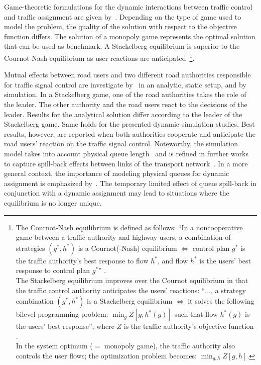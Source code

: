 Game-theoretic formulations for the dynamic interactions between traffic control and traffic assignment are given by~\citet{ChenBenAkiva1998GameDynamicTrafficControl}. 
Depending on the type of game used to model the problem, the quality of the solution with respect to the objective function differs.  
The solution of a monopoly game represents the optimal solution that can be used as benchmark. 
A Stackelberg equilibrium is superior to the Cournot-Nash equilibrium as user reactions are anticipated~\citep{ChenBenAkiva1998GameDynamicTrafficControl}\footnote{
%
The Cournot-Nash equilibrium is defined as follows: 
``In a noncooperative game between a traffic authority and highway
users, a combination of strategies $(g^*, h^*)$ is a Cournot(-Nash) equilibrium
$\Leftrightarrow$ control plan $g^*$ is the traffic authority's best
response to flow $h^*$, and flow $h^*$ is the users' 
best response to control plan $g^*$'' \citep[from][]{ChenBenAkiva1998GameDynamicTrafficControl}.
%
\\
%
The Stackelberg equilibrium improves over the Cournot equilibrium in
that the traffic control authority anticipates the users' reactions:
``$\ldots$, a strategy combination $(g^*,h^*)$ is a Stackelberg
equilibrium $\Leftrightarrow$ it solves the following bilevel
programming problem: $\min_g Z[g,h^*(g)]$ such that flow $h^*(g)$ is
the users' best response'', where $Z$ is the traffic authority's
objective function \citep[after][]{ChenBenAkiva1998GameDynamicTrafficControl}.
%
\\
%
In the system optimum ($=$ monopoly game), the traffic authority also
controls the user flows; the optimization problem becomes: $\min_{g,h}
Z[g,h]$.
%
}.

Mutual effects between road users and two different road authorities responsible for traffic signal control are investigate by~\citet{VanZuylenTaale2004UrbanRingRoads} in an analytic, static setup, and by simulation.  
In a Stackelberg game, one of the road authorities takes the role of the leader. 
The other authority and the road users react to the decisions of the leader. 
Results for the analytical solution differ according to the leader of the Stackelberg game.  
Same holds for the presented dynamic simulation studies. 
Best results, however, are reported when both authorities cooperate and anticipate the road users' reaction on the traffic signal control. 
Noteworthy, the simulation model takes into account physical queue length~\citep{TaaleVanZuylen2003AnticipatoryTrafficControl} and is refined in further works to capture spill-back effects between links of the transport network~\citep{Taale2008Phd}. 
In a more general context, the importance of modeling physical queues for dynamic assignment is emphasized by~\citet{DaganzoAssign-w-queues}.  
The temporary limited effect of queue spill-back in conjunction with a dynamic assignment may lead to situations where the equilibrium is no longer unique.  

